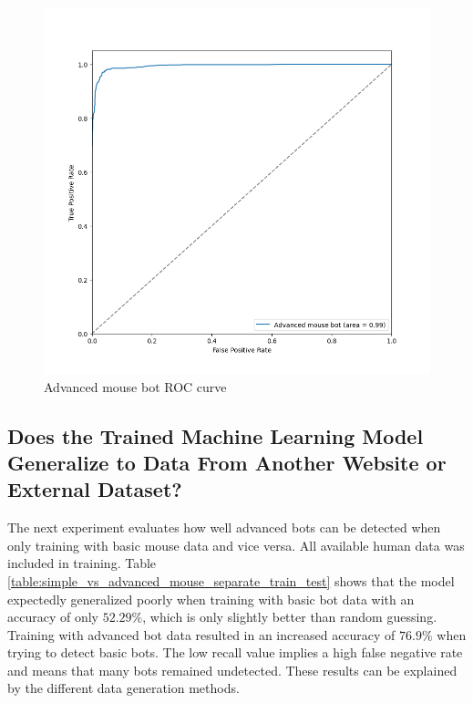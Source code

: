 \documentclass[
    fontsize=12pt,
    headings=small,
    parskip=half,           %
    bibliography=totoc,
    numbers=noenddot,       %
    open=any,               %
    final,                   %
    table
]{scrreprt}
\begin{document}
\begin{figure}[H]
    \includegraphics[width=\textwidth]{figures/mouse_advanced_roc.png}
    \caption{Advanced mouse bot ROC curve}
    \label{fig:mouse_advanced_roc}
\end{figure}

\subsection{Does the Trained Machine Learning Model Generalize to Data From Another Website or External Dataset?}

The next experiment evaluates how well advanced bots can be detected when only training with basic mouse data and vice versa. All available human data was included in training. Table \ref{table:simple_vs_advanced_mouse_separate_train_test} shows that the model expectedly generalized poorly when training with basic bot data with an accuracy of only $52.29\%$, which is only slightly better than random guessing. Training with advanced bot data resulted in an increased accuracy of $76.9\%$ when trying to detect basic bots. The low recall value implies a high false negative rate and means that many bots remained undetected. These results can be explained by the different data generation methods.
\end{document}
